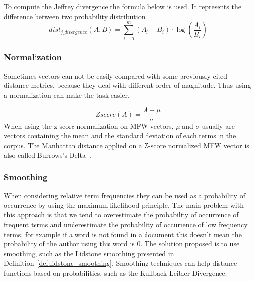 \begin{definition}
  To compute the Jeffrey divergence the formula below is used.
  It represents the difference between two probability distribution.
  \begin{equation}
    dist_{j\_divergence}(A, B) = \sum_{i=0}^{m} (A_i - B_i) \cdot \log(\frac{A_i}{B_i})
  \end{equation}
\end{definition}


\subsubsection{Normalization}

Sometimes vectors can not be easily compared with some previously cited distance metrics, because they deal with different order of magnitude.
Thus using a normalization can make the task easier.

\begin{definition}
  \label{def:z_score}
  \begin{equation}
    Zscore(A) = \frac{A - \mu}{\sigma}
  \end{equation}
  When using the z-score normalization on MFW vectors, $\mu$ and $\sigma$ usually are vectors containing the mean and the standard deviation of each terms in the corpus.
  The Manhattan distance applied on a Z-score normalized MFW vector is also called Burrows's Delta~\cite{savoy_stylo}.
\end{definition}

\subsubsection{Smoothing}

When considering relative term frequencies they can be used as a probability of occurrence by using the maximum likelihood principle.
The main problem with this approach is that we tend to overestimate the probability of occurrence of frequent terms and underestimate the probability of occurrence of low frequency terms, for example if a word is not found in a document this doesn't mean the probability of the author using this word is 0.
The solution proposed is to use smoothing, such as the Lidstone smoothing presented in Definition~\ref{def:lidstone_smoothing}.
Smoothing techniques can help distance functions based on probabilities, such as the Kullback-Leibler Divergence.


